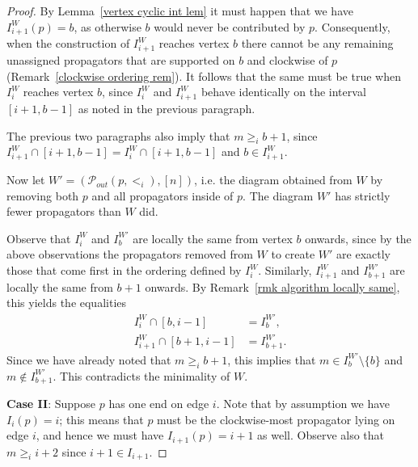 \documentclass[11pt]{article}
\newcommand{\sanote}{\todo[color=violet!30]}
\newcommand{\cP}{\mathcal{P}}
\theoremstyle{remark}
\theoremstyle{definition}
\begin{document}
\begin{proof}
By Lemma~\ref{vertex cyclic int lem} it must happen that we have $I_{i+1}^W(p) = b$, as otherwise $b$ would never be contributed by $p$.  Consequently, when the construction of $I_{i+1}^W$ reaches vertex $b$ there cannot be any remaining unassigned propagators that are supported on $b$ and clockwise of $p$ (Remark~\ref{clockwise ordering rem}). It follows that the same must be true when $I_i^W$ reaches vertex $b$, since $I_i^W$ and $I_{i+1}^W$ behave identically on the interval $[i+1,b-1]$ as noted in the previous paragraph. 

The previous two paragraphs also imply that $m \geq_i b+1$, since $I_{i+1}^W \cap [i+1,b-1] = I_{i}^W \cap [i+1,b-1]$ and $b \in I_{i+1}^W$.


Now let $W' = (\cP_{out}(p,<_i), [n])$, i.e. the diagram obtained from $W$ by removing both $p$ and all propagators inside of $p$. The diagram $W'$ has strictly fewer propagators than $W$ did.

Observe that $I_i^W$ and $I_b^{W'}$ are locally the same from vertex $b$ onwards, since by the above observations the propagators removed from $W$ to create $W'$ are exactly those that come first in the ordering defined by $I_i^W$. Similarly, $I_{i+1}^W$ and $I_{b+1}^{W'}$ are locally the same from $b+1$ onwards. By Remark~\ref{rmk algorithm locally same}, this yields the equalities
\begin{align*}
  I_i^{W} \cap [b,i-1] & = I_b^{W'}, \\
  I_{i+1}^{W} \cap [b+1,i-1] & = I_{b+1}^{W'}.
\end{align*} 
Since we have already noted that $m \geq_i b+1$, this implies that $m\in I_b^{W'}\setminus\{b\}$ and $m\not\in I_{b+1}^{W'}$. This contradicts the minimality of $W$.

\textbf{Case II}: Suppose $p$ has one end on edge $i$.  Note that by assumption we have $I_i(p) = i$; this means that $p$ must be the clockwise-most propagator lying on edge $i$, and hence we must have $I_{i+1}(p) = i+1$ as well.  Observe also that $m\geq_i i+2$ since $i+1\in I_{i+1}$.


\end{proof}
\end{document}
